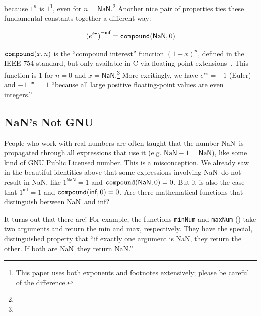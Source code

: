 \documentclass[twocolumn,cm]{article}
\newcommand\nan{\textsf{NaN}}
\renewcommand\inf{\textsf{inf}}
\begin{document}
because $1^n$ is $1$\footnote{This paper uses both exponents and footnotes
  extensively; please be careful of the difference.}, even for $n=\nan$.\footnote{} Another nice
pair of properties ties these fundamental constants together a
different way:

\begin{huge}
  \[
  {(e^{i \pi})}^{-\inf} = {\tt compound}(\nan, 0)
  \]
\end{huge}

${\tt compound}(x, n)$ is the ``compound interest'' function
$(1 + x)^n$, defined in the IEEE 754 standard, but only available
in C via floating point extensions~\cite{fpextensions}. This
function is $1$ for $n=0$ and $x=\nan$.\footnote{}
More excitingly, we have $e^{i \pi} = -1$ (Euler) and ${-1}^{-\inf} =
1$ ``because all large positive floating-point values are even
integers.''~\cite{crationale510}

\subsection{NaN's Not GNU} \label{sec:logical}

People who work with real numbers are often taught that the number
\nan\ is propagated through all expressions that use it (e.g. $\nan -
1 = \nan$), like some kind of GNU Public Licensed number. This is a
misconception. We already saw in the beautiful identities above that
some expressions involving \nan\ do not result in \nan, like $1^{\nan}
= 1$ and ${\tt compound}(\nan, 0) = 0$. But it is also the case that
$1^{\inf} = 1$ and ${\tt compound}(\inf, 0) = 0$. Are there mathematical
functions that distinguish between \nan\ and \inf? 

It turns out that there are! For example, the functions {\tt minNum}
and {\tt maxNum} () take two arguments and return the
min and max, respectively. They have the special, distinguished property
that ``if exactly one argument is \nan, they return the other. If
both are \nan\ they return \nan.'' 
\end{document}
